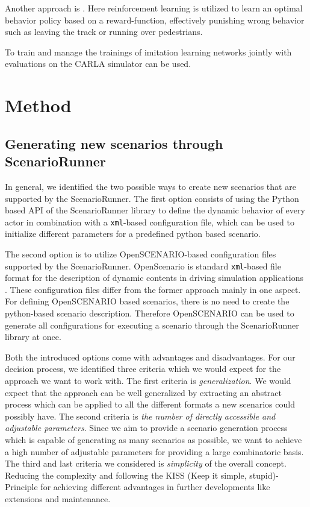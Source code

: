 \documentclass[conference, 11pt]{IEEEtran}
\begin{document}
Another approach is  \cite{Toromanoff_2020_CVPR}. Here reinforcement learning is utilized to learn an optimal behavior policy based on a reward-function, effectively punishing wrong behavior such as leaving the track or running over pedestrians.

To train and manage the trainings of imitation learning networks jointly with evaluations on the CARLA simulator  \cite{felipecode:coiltraine} can be used.

\section{Method}

\subsection{Generating new scenarios through ScenarioRunner}
In general, we identified the two possible ways to create new scenarios that are supported by the ScenarioRunner.
The first option consists of using the Python based API of the ScenarioRunner library to define the dynamic behavior of every actor in combination with a \texttt{xml}-based configuration file, which can be used to initialize different parameters for a predefined python based scenario.

The second option is to utilize  OpenSCENARIO-based configuration files supported by the ScenarioRunner. OpenScenario is standard \texttt{xml}-based file format for the description of dynamic contents in driving simulation applications \cite{OpenScenario}. These configuration files differ from the former approach mainly in one aspect. For defining OpenSCENARIO based scenarios, there is no need to create the python-based scenario description. Therefore OpenSCENARIO can be used to generate all configurations for executing a scenario through the ScenarioRunner library at once. 

Both the introduced options come with advantages and disadvantages. For our decision process, we identified three criteria which we would expect for the approach we want to work with. 
The first criteria is  \textit{generalization}. We would expect that the approach can be well generalized by extracting an abstract process which can be applied to all the different formats a new scenarios could possibly have.
The second criteria is \textit{the number of directly  accessible and adjustable parameters}. Since we aim to provide a scenario generation process which is capable of generating as many scenarios as possible, we want to achieve a high number of adjustable parameters for providing a large combinatoric basis.
The third and last criteria we considered is \textit{simplicity} of the overall concept. Reducing the complexity and  following the KISS (Keep it simple, stupid)-Principle for achieving different advantages in further developments like extensions and maintenance. 
\end{document}
